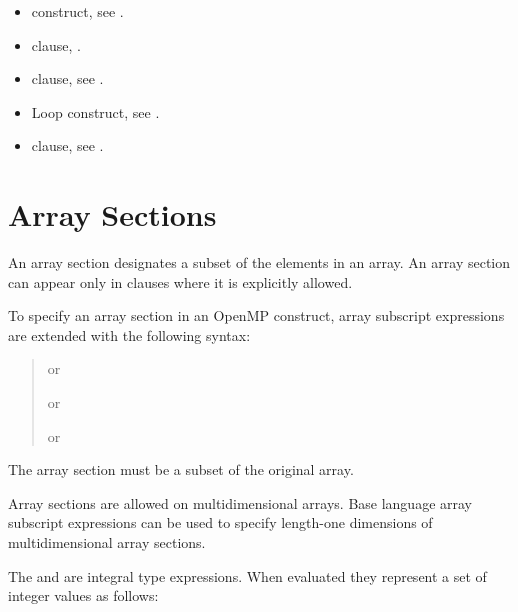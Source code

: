 \crossreferences
\begin{itemize}
\item {} construct, see 
.

\item {} clause, 
.

\item {} clause, see 
.

\item Loop construct, see 
.

\item {} clause, see 
.
\end{itemize}










\section{Array Sections}
\label{sec:Array Sections}
An array section designates a subset of the elements in an array. An array section can
appear only in clauses where it is explicitly allowed.

\ccppspecificstart
To specify an array section in an OpenMP construct, array subscript expressions are 
extended with the following syntax:

\begin{quote}
 or

 or

 or

\code{[\plc{ }:\plc{ }]}
\end{quote}

The array section must be a subset of the original array.

Array sections are allowed on multidimensional arrays. Base language array subscript 
expressions can be used to specify length-one dimensions of multidimensional array 
sections.

The  and  are integral type expressions. When evaluated they 
represent a set of integer values as follows:

